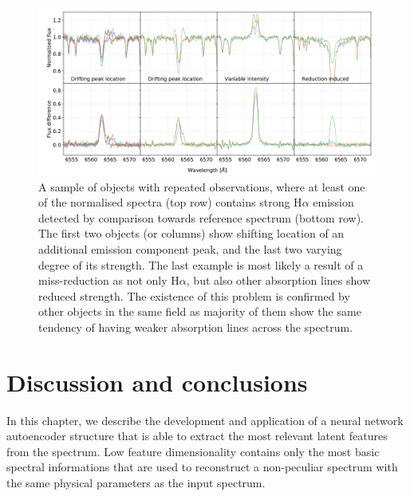 \begin{figure}
	\centering
	\includegraphics[width=\textwidth]{repetas_spectra_spectra_ccd3.pdf}
	\caption{A sample of objects with repeated observations, where at least one of the normalised spectra (top row) contains strong H$\alpha$ emission detected by comparison towards reference spectrum (bottom row). The first two objects (or columns) show shifting location of an additional emission component peak, and the last two varying degree of its strength. The last example is most likely a result of a miss-reduction as not only H$\alpha$, but also other absorption lines show reduced strength. The existence of this problem is confirmed by other objects in the same field as majority of them show the same tendency of having weaker absorption lines across the spectrum.}
	\label{fig:temporal_variab}
\end{figure}

\section{Discussion and conclusions}
\label{sec:discussion_emis} 
In this chapter, we describe the development and application of a neural network autoencoder structure that is able to extract the most relevant latent features from the spectrum. Low feature dimensionality contains only the most basic spectral informations that are used to reconstruct a non-peculiar spectrum with the same physical parameters as the input spectrum.

